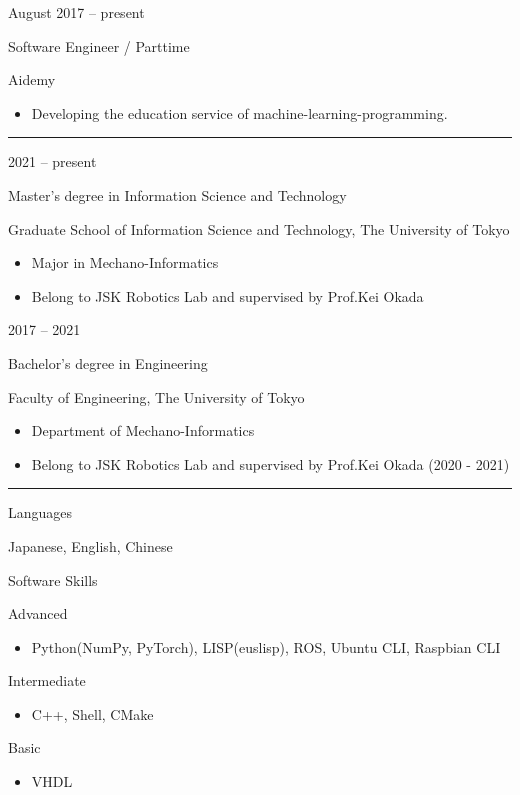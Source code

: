 \documentclass[a4paper,10pt]{article}
\newlength{\cvcolumngapwidth}
\newlength{\cvleftcolumnwidth}
\newlength{\cvrightcolumnwidth}
\newcommand{\cvsectionstyle}[1]{{\normalsize\cvsectionfont\textcolor{cvsectioncolor}{#1}}}
\newcommand{\cvtitlestyle}[1]{{\large\cvtitlefont\textcolor{cvtitlecolor}{#1}}}
\newcommand{\cvdurationstyle}[1]{{\small\cvdurationfont\textcolor{cvdurationcolor}{#1}}}
\newcommand{\cvheadingstyle}[1]{{\normalsize\cvheadingfont\textcolor{cvheadingcolor}{#1}}}
\newlength{\cvafteritemskipamount}
\newlength{\cvaftersectionskipamount}
\newlength{\cvbetweensectionandheadingextraskipamount}
\newlength{\cvaftertitleskipamount}
\newlength{\cvparskip}
\newcommand{\cvsection}[1]{
    \begin{minipage}[t]{\cvleftcolumnwidth}
        \raggedleft\cvsectionstyle{#1}
    \end{minipage}%
    \hspace{\cvcolumngapwidth}%
    \begin{minipage}[t]{\cvrightcolumnwidth}
        \textcolor{cvrulecolor}{\rule{\cvrightcolumnwidth}{0.3mm}}
    \end{minipage}

    \vspace{\cvaftersectionskipamount}
}
\newcommand{\cvitem}[2]{
    \begin{minipage}[t]{\cvleftcolumnwidth}
        \raggedleft #1
    \end{minipage}%
    \hspace{\cvcolumngapwidth}%
    \begin{minipage}[t]{\cvrightcolumnwidth}
        \setlength{\parskip}{\cvparskip} #2
    \end{minipage}

    \vspace{\cvafteritemskipamount}
}
\newcommand{\cvtitle}[1]{
    \cvtitlestyle{#1}

    \vspace{\cvaftertitleskipamount}
    \vspace{-\cvparskip}
}
\begin{document}
\cvitem{
    \cvdurationstyle{August 2017 -- present}
}{
    \cvtitle{Software Engineer / Parttime}

    Aidemy

    \begin{itemize}[leftmargin=*]
        \item Developing the education service of machine-learning-programming.
    \end{itemize}
}



\cvsection{EDUCATION}

\cvitem{
    \cvdurationstyle{2021 -- present}
}{
    \cvtitle{Master's degree in Information Science and Technology}

    Graduate School of Information Science and Technology, The University of Tokyo

    \begin{itemize}[leftmargin=*]
        \item Major in Mechano-Informatics 
        \item Belong to JSK Robotics Lab and supervised by Prof.Kei Okada
    \end{itemize}
}

\cvitem{
    \cvdurationstyle{2017 -- 2021}
}{
    \cvtitle{Bachelor's degree in Engineering}

    Faculty of Engineering, The University of Tokyo

    \begin{itemize}[leftmargin=*]
        \item Department of Mechano-Informatics
        \item Belong to JSK Robotics Lab and supervised by Prof.Kei Okada (2020 - 2021)
    \end{itemize}
}



\cvsection{SKILLS}

\vspace{\cvbetweensectionandheadingextraskipamount}

\cvitem{
    \cvheadingstyle{Languages}
}{
  Japanese, English, Chinese
}

\cvitem{
    \cvheadingstyle{Software Skills}
}{
  Advanced
  \begin{itemize}
    \item Python(NumPy, PyTorch), LISP(euslisp), ROS, Ubuntu CLI, Raspbian CLI
  \end{itemize}
  Intermediate
  \begin{itemize}
    \item C++, Shell, CMake 
  \end{itemize}
  Basic
  \begin{itemize}
    \item VHDL
  \end{itemize}
}
\end{document}
